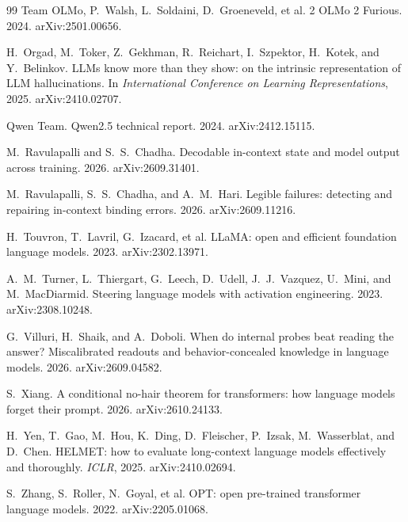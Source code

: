 \documentclass{article}
\begin{document}
\begin{thebibliography}{99}
Team OLMo, P.~Walsh, L.~Soldaini, D.~Groeneveld, et al. 2 OLMo 2 Furious. 2024. arXiv:2501.00656.

H.~Orgad, M.~Toker, Z.~Gekhman, R.~Reichart, I.~Szpektor, H.~Kotek, and Y.~Belinkov. LLMs know more
than they show: on the intrinsic representation of LLM hallucinations. In \emph{International
Conference on Learning Representations}, 2025. arXiv:2410.02707.

Qwen Team. Qwen2.5 technical report. 2024. arXiv:2412.15115.

M.~Ravulapalli and S.~S.~Chadha. Decodable in-context state and model output across training. 2026.
arXiv:2609.31401.

M.~Ravulapalli, S.~S.~Chadha, and A.~M.~Hari. Legible failures: detecting and repairing in-context
binding errors. 2026. arXiv:2609.11216.

H.~Touvron, T.~Lavril, G.~Izacard, et al. LLaMA: open and efficient foundation language models.
2023. arXiv:2302.13971.

A.~M.~Turner, L.~Thiergart, G.~Leech, D.~Udell, J.~J.~Vazquez, U.~Mini, and M.~MacDiarmid. Steering
language models with activation engineering. 2023. arXiv:2308.10248.

G.~Villuri, H.~Shaik, and A.~Doboli. When do internal probes beat reading the answer? Miscalibrated
readouts and behavior-concealed knowledge in language models. 2026. arXiv:2609.04582.

S.~Xiang. A conditional no-hair theorem for transformers: how language models forget their prompt.
2026. arXiv:2610.24133.

H.~Yen, T.~Gao, M.~Hou, K.~Ding, D.~Fleischer, P.~Izsak, M.~Wasserblat, and D.~Chen.
HELMET: how to evaluate long-context language models effectively and thoroughly. \emph{ICLR}, 2025.
arXiv:2410.02694.

S.~Zhang, S.~Roller, N.~Goyal, et al. OPT: open pre-trained transformer language models. 2022.
arXiv:2205.01068.

\end{thebibliography}
\end{document}
